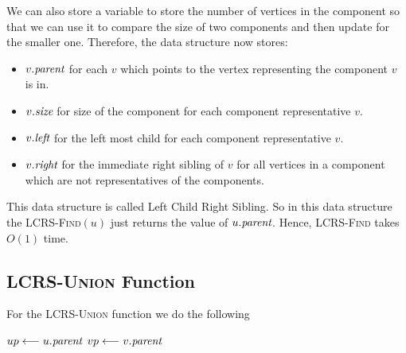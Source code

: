 We can also store a variable to store the number of vertices in the component so that we can use it to compare the size of two components and then update for the smaller one. Therefore, the data structure now stores:
\begin{itemize}
	\item $v.\emph{parent}$ for each $v$ which points to the vertex representing the component $v$ is in.
	\item $v.\emph{size}$ for size of the component for each component representative $v$.
	\item $v.\emph{left}$ for the left most child for each component representative $v$.
	\item $v.\emph{right}$ for the immediate right sibling of $v$ for all vertices in a component which are not  representatives of the components.
\end{itemize}\parinf

This data structure is called Left Child Right Sibling. So in this data structure the \textsc{LCRS-Find}$(u)$ just returns the value of $u.\emph{parent}$. Hence, \textsc{LCRS-Find} takes $O(1)$ time.
\subsection{\textsc{LCRS-Union} Function}
For the \textsc{LCRS-Union} function we do the following
\begin{algorithm}[htbp]
	\caption{\textsc{LCRS-Union}$(u,v)$}
	\DontPrintSemicolon
	$up\longleftarrow u.\emph{parent}$\; $vp\longleftarrow v.\emph{parent}$\;
\end{algorithm}

